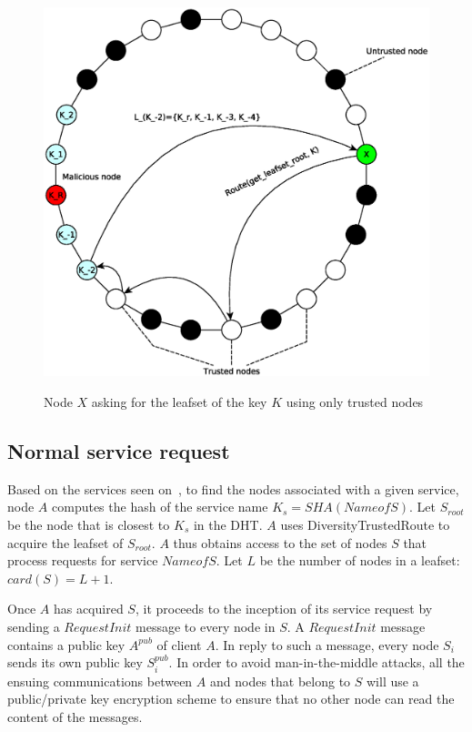 \begin{figure}[!htb]
\centering
\includegraphics[width=14cm]{../img/secure_routing}\\
\caption{Node $X$ asking for the leafset of the key $K$ using only trusted nodes}
\label{fig:secure_routing}
\end{figure}


\subsection{Normal service request}

Based on the services seen on~\cite{p2p_certification}, to find the nodes associated with a given
service, node $A$ computes the hash
of the service name $K_s = SHA(NameofS)$. Let $S_{root} $ be the node that
is closest to $K_s$ in the DHT. $A$ uses DiversityTrustedRoute to acquire the
leafset of $S_{root}$. $A$ thus obtains access to the set of nodes $S$ that
process requests for service $NameofS$. Let $L$ be the number of nodes in a
leafset: $card(S) = L + 1$.

Once $A$ has acquired $S$, it proceeds to the inception of its service request
by sending a $RequestInit$ message to every node in $S$. A $RequestInit$
message contains a public key $A^{pub}$ of client $A$. In reply to such a
message, every node $S_i$ sends its own public key $S^{pub}_i$. In order to
avoid man-in-the-middle attacks, all the ensuing communications between $A$ and
nodes that belong to $S$ will use a public/private key encryption scheme to
ensure that no other node can read the content of the messages.


